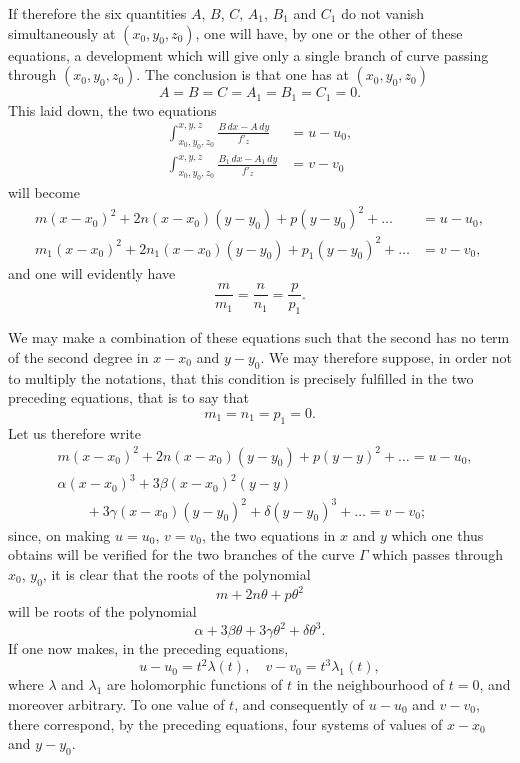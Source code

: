 \documentclass{article}
\begin{document}
If therefore the six quantities $A$, $B$, $C$, $A_{1}$, $B_{1}$ and $C_{1}$ do not vanish simultaneously at $(x_{0}, y_{0}, z_{0})$, one will have, by one or the other of these equations, a development which will give only a single branch of curve passing through $(x_{0}, y_{0}, z_{0})$. The conclusion is that one has at $(x_{0}, y_{0}, z_{0})$
\[
A = B = C = A_{1} = B_{1} = C_{1} = 0.
\]
This laid down, the two equations
\[
\begin{aligned}
\int_{x_{0}, y_{0}, z_{0}}^{x, y, z} \frac{B\,dx - A\,dy}{f'_{z}} &= u - u_{0}, \\
\int_{x_{0}, y_{0}, z_{0}}^{x, y, z} \frac{B_{1}\,dx - A_{1}\,dy}{f'_{z}} &= v - v_{0}
\end{aligned}
\]
will become
\[
\begin{aligned}
m(x - x_{0})^{2} + 2n(x - x_{0})(y - y_{0}) + p(y - y_{0})^{2} + \ldots &= u - u_{0}, \\
m_{1}(x - x_{0})^{2} + 2n_{1}(x - x_{0})(y - y_{0}) + p_{1}(y - y_{0})^{2} + \ldots &= v - v_{0},
\end{aligned}
\]
and one will evidently have
\[
\frac{m}{m_{1}} = \frac{n}{n_{1}} = \frac{p}{p_{1}}.
\]

We may make a combination of these equations such that the second has no term of the second degree in $x - x_{0}$ and $y - y_{0}$. We may therefore suppose, in order not to multiply the notations, that this condition is precisely fulfilled in the two preceding equations, that is to say that
\[
m_{1} = n_{1} = p_{1} = 0.
\]
Let us therefore write
\[
\begin{aligned}
&m(x - x_{0})^{2} + 2n(x - x_{0})(y - y_{0}) + p(y - y)^{2} + \ldots = u - u_{0}, \\
&\alpha(x - x_{0})^{3} + 3\beta(x - x_{0})^{2}(y - y) \\
&\qquad + 3\gamma(x - x_{0})(y - y_{0})^{2} + \delta(y - y_{0})^{3} + \ldots = v - v_{0};
\end{aligned}
\]
since, on making $u = u_{0}$, $v = v_{0}$, the two equations in $x$ and $y$ which one thus obtains will be verified for the two branches of the curve $\Gamma$ which passes through $x_{0}$, $y_{0}$, it is clear that the roots of the polynomial
\[
m + 2n\theta + p\theta^{2}
\]
will be roots of the polynomial
\[
\alpha + 3\beta\theta + 3\gamma\theta^{2} + \delta\theta^{3}.
\]
If one now makes, in the preceding equations,
\[
u - u_{0} = t^{2}\lambda(t), \quad v - v_{0} = t^{3}\lambda_{1}(t),
\]
where $\lambda$ and $\lambda_{1}$ are holomorphic functions of $t$ in the neighbourhood of $t = 0$, and moreover arbitrary. To one value of $t$, and consequently of $u - u_{0}$ and $v - v_{0}$, there correspond, by the preceding equations, four systems of values of $x - x_{0}$ and $y - y_{0}$.
\end{document}
